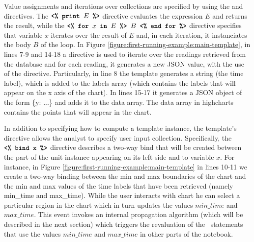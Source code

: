  Value assignments and iterations over collections are specified by using the  and  directives. The $\texttt{\textbf{<\% print }} E \texttt{\textbf{ \%>}}$ directive evaluates the expression $E$ and returns the result, while the $\texttt{\textbf{<\% for }} x \texttt{\textbf{ in }} E \texttt{\textbf{ \%> }} B \texttt{\textbf{ <\% end for \%>}}$ directive specifies that variable $x$ iterates over the result of $E$ and, in each iteration, it instanciates the body $B$ of the  loop. In Figure \ref{figure:first-running-example:main-template}, in lines 7-9 and 14-18 a  directive is used to iterate over the readings retrieved from the database and for each reading, it generates a new JSON value, with the use of the  directive. Particularly, in line 8 the template generates a string (the time label), which is added to the labels array (which contains the labels that will appear on the x axis of the chart). In lines 15-17 it generates a JSON object of the form \{y: ...\} and adds it to the data array. The data array in highcharts contains the points that will appear in the chart.

 In addition to specifying how to compute a template instance, the template's  directive allows the analyst to specify user input collection. Specifically, the $\texttt{\textbf{<\% bind x}} \texttt{\textbf{ \%>}}$ directive describes a two-way bind that will be created between the part of the unit instance appearing on its left side and to variable $x$. For instance, in Figure \ref{figure:first-running-example:main-template} in lines 10-11 we create a two-way binding between the min and max boundaries of the chart and the min and max values of the time labels that have been retrieved (namely min\_time and max\_time). While the user interacts with chart he can select a particular region in the chart which in turn updates the values $min\_time$ and $max\_time$. This event invokes an internal propagation algorithm (which will be described in the next section) which triggers the revaluation of the \projname\ statements that use the values $min\_time$ and $max\_time$ in other parts of the notebook.




